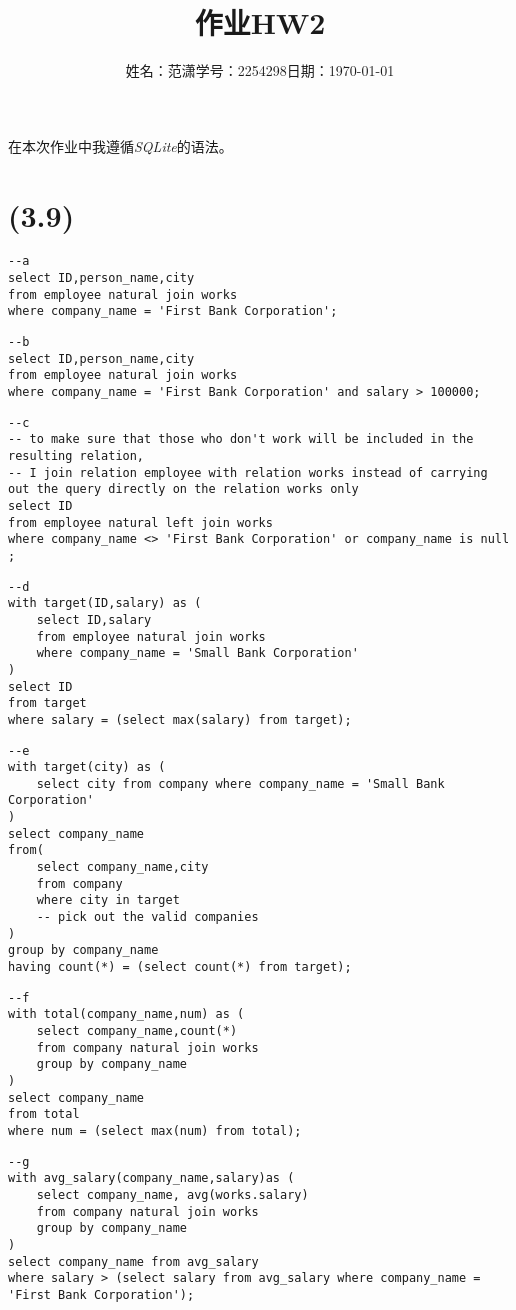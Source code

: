\documentclass[a4paper]{article}
\title{作业{\hspace{1ex}}HW2}
\author{姓名：范潇{\quad}学号：2254298{\quad}日期：\today}
\date{}
\begin{document}
\maketitle
在本次作业中我遵循\emph{SQLite}的语法。
\section{(3.9)}
\begin{lstlisting}
--a
select ID,person_name,city
from employee natural join works
where company_name = 'First Bank Corporation';   
\end{lstlisting}
\begin{lstlisting}
--b
select ID,person_name,city
from employee natural join works
where company_name = 'First Bank Corporation' and salary > 100000;
\end{lstlisting}
\begin{lstlisting}
--c
-- to make sure that those who don't work will be included in the resulting relation,
-- I join relation employee with relation works instead of carrying out the query directly on the relation works only
select ID
from employee natural left join works
where company_name <> 'First Bank Corporation' or company_name is null ; 
\end{lstlisting}
\begin{lstlisting}
--d
with target(ID,salary) as (
    select ID,salary
    from employee natural join works
    where company_name = 'Small Bank Corporation'
)
select ID
from target
where salary = (select max(salary) from target);    
\end{lstlisting}
\begin{lstlisting}
--e
with target(city) as (
    select city from company where company_name = 'Small Bank Corporation'
)
select company_name
from(
    select company_name,city
    from company
    where city in target
    -- pick out the valid companies
)
group by company_name
having count(*) = (select count(*) from target);    
\end{lstlisting}
\begin{lstlisting}
--f
with total(company_name,num) as (
    select company_name,count(*)
    from company natural join works
    group by company_name
)
select company_name
from total
where num = (select max(num) from total);    
\end{lstlisting}
\begin{lstlisting}
--g
with avg_salary(company_name,salary)as (
    select company_name, avg(works.salary)
    from company natural join works
    group by company_name
)
select company_name from avg_salary
where salary > (select salary from avg_salary where company_name = 'First Bank Corporation');
\end{lstlisting}
\end{document}
